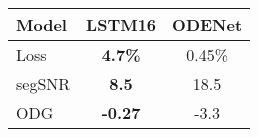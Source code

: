 \newcommand{\modelNameCellWidth}{1.8cm}
    \begin{tabular}{@{} l | c c @{}}
        \toprule
        Model & LSTM16 & ODENet \\ \midrule
        Loss    & \textbf{4.7\%} & 0.45\% \\
        segSNR  & \textbf{8.5} & 18.5  \\
        ODG     & \textbf{-0.27} & -3.3\\ \bottomrule
    \end{tabular}%
    